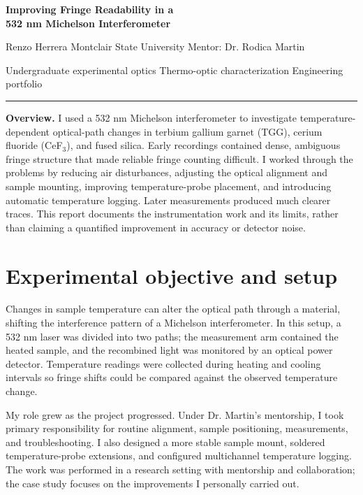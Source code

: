 \documentclass[10pt,a4paper]{extarticle}
\begin{document}
\begin{center}
{\LARGE\bfseries\color{navy} Improving Fringe Readability in a\\[2pt] 532 nm Michelson Interferometer}\par
\vspace{6pt}
{\small Renzo Herrera \quad\textbar\quad Montclair State University \quad\textbar\quad Mentor: Dr. Rodica Martin}\par
\vspace{4pt}
{\footnotesize\color{muted} Undergraduate experimental optics \hspace{6pt}\textbullet\hspace{6pt} Thermo-optic characterization \hspace{6pt}\textbullet\hspace{6pt} Engineering portfolio}\par
\end{center}
\vspace{3pt}
{\color{line}\hrule}
\vspace{8pt}
\textbf{Overview.} I used a 532 nm Michelson interferometer to investigate temperature-dependent optical-path changes in terbium gallium garnet (TGG), cerium fluoride (CeF$_3$), and fused silica. Early recordings contained dense, ambiguous fringe structure that made reliable fringe counting difficult. I worked through the problems by reducing air disturbances, adjusting the optical alignment and sample mounting, improving temperature-probe placement, and introducing automatic temperature logging. Later measurements produced much clearer traces. This report documents the instrumentation work and its limits, rather than claiming a quantified improvement in accuracy or detector noise.

\section{Experimental objective and setup}
Changes in sample temperature can alter the optical path through a material, shifting the interference pattern of a Michelson interferometer. In this setup, a 532 nm laser was divided into two paths; the measurement arm contained the heated sample, and the recombined light was monitored by an optical power detector. Temperature readings were collected during heating and cooling intervals so fringe shifts could be compared against the observed temperature change.

My role grew as the project progressed. Under Dr. Martin's mentorship, I took primary responsibility for routine alignment, sample positioning, measurements, and troubleshooting. I also designed a more stable sample mount, soldered temperature-probe extensions, and configured multichannel temperature logging. The work was performed in a research setting with mentorship and collaboration; the case study focuses on the improvements I personally carried out.
\end{document}
